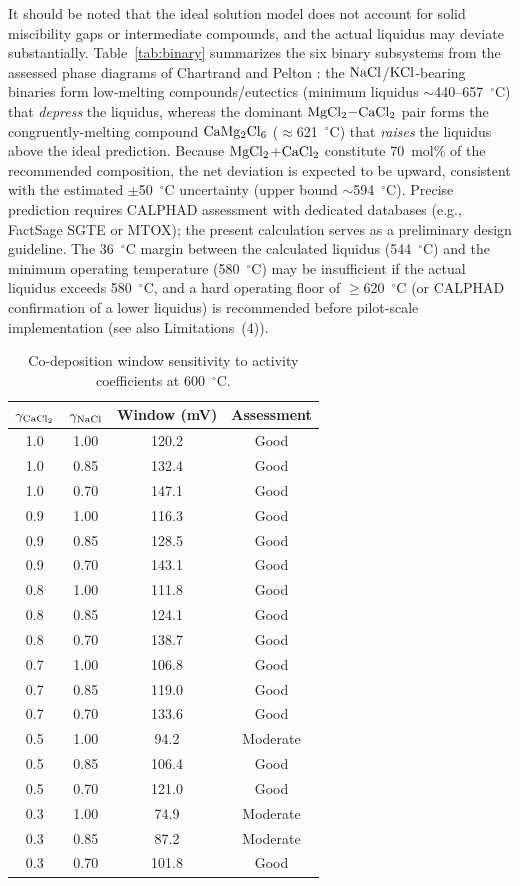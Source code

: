 \documentclass[11pt]{article}
\begin{document}
It should be noted that the ideal solution model does not account for solid miscibility gaps or intermediate compounds, and the actual liquidus may deviate substantially. Table~\ref{tab:binary} summarizes the six binary subsystems from the assessed phase diagrams of Chartrand and Pelton \cite{chartrand2000}: the $\ce{NaCl}$/$\ce{KCl}$-bearing binaries form low-melting compounds/eutectics (minimum liquidus $\sim$440--657~$^{\circ}$C) that \emph{depress} the liquidus, whereas the dominant $\ce{MgCl2-CaCl2}$ pair forms the congruently-melting compound $\ce{CaMg2Cl6}$ ($\approx$621~$^{\circ}$C) that \emph{raises} the liquidus above the ideal prediction. Because $\ce{MgCl2}$+$\ce{CaCl2}$ constitute 70~mol\% of the recommended composition, the net deviation is expected to be upward, consistent with the estimated $\pm$50~$^{\circ}$C uncertainty (upper bound $\sim$594~$^{\circ}$C). Precise prediction requires CALPHAD assessment with dedicated databases (e.g., FactSage SGTE or MTOX); the present calculation serves as a preliminary design guideline. The 36~$^{\circ}$C margin between the calculated liquidus (544~$^{\circ}$C) and the minimum operating temperature (580~$^{\circ}$C) may be insufficient if the actual liquidus exceeds 580~$^{\circ}$C, and a hard operating floor of $\geq$620~$^{\circ}$C (or CALPHAD confirmation of a lower liquidus) is recommended before pilot-scale implementation (see also Limitations~(4)).

\begin{table}[!ht]
\centering
\footnotesize
\caption{Co-deposition window sensitivity to activity coefficients at 600~$^{\circ}$C.}
\label{tab:window_sens}
\begin{tabular}{cccc}
\toprule
$\gamma_{\ce{CaCl2}}$ & $\gamma_{\ce{NaCl}}$ & Window (mV) & Assessment \\
\midrule
1.0 & 1.00 & 120.2 & Good \\
1.0 & 0.85 & 132.4 & Good \\
1.0 & 0.70 & 147.1 & Good \\
0.9 & 1.00 & 116.3 & Good \\
0.9 & 0.85 & 128.5 & Good \\
0.9 & 0.70 & 143.1 & Good \\
0.8 & 1.00 & 111.8 & Good \\
0.8 & 0.85 & 124.1 & Good \\
0.8 & 0.70 & 138.7 & Good \\
0.7 & 1.00 & 106.8 & Good \\
0.7 & 0.85 & 119.0 & Good \\
0.7 & 0.70 & 133.6 & Good \\
0.5 & 1.00 & 94.2 & Moderate \\
0.5 & 0.85 & 106.4 & Good \\
0.5 & 0.70 & 121.0 & Good \\
0.3 & 1.00 & 74.9 & Moderate \\
0.3 & 0.85 & 87.2 & Moderate \\
0.3 & 0.70 & 101.8 & Good \\
\bottomrule
\end{tabular}
\end{table}
\end{document}
